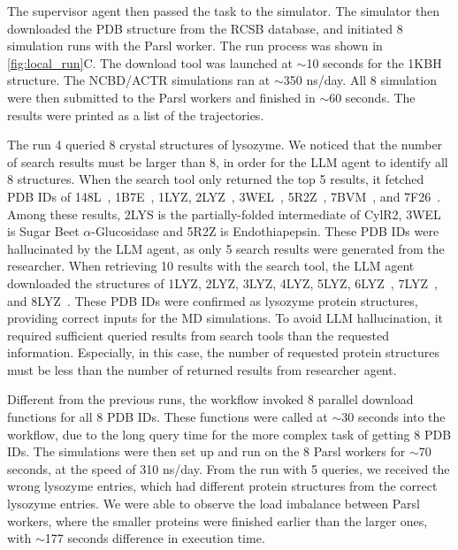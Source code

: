 The supervisor agent then passed the task to the simulator. 
The simulator then downloaded the PDB structure from the RCSB database, and initiated 8  simulation runs with the Parsl worker. 
The run process was shown in \autoref{fig:local_run}C. 
The download tool was launched at $\sim$10 seconds for the 1KBH structure. 
The NCBD/ACTR simulations ran at $\sim$350 ns/day. 
All 8 simulation were then submitted to the Parsl workers and finished in $\sim$60 seconds. 
The results were printed as a list of the trajectories. 


The run 4 queried 8 crystal structures of lysozyme. 
We noticed that the number of search results must be larger than 8, in order for the LLM agent to identify all 8 structures. 
When the search tool only returned the top 5 results, it fetched PDB IDs of 148L~\cite{kuroki1993covalent_148L}, 
1B7E~\cite{davies1999three_1b7e}, 
1LYZ, 
2LYZ~\cite{diamond1974real_1lyz}, 
3WEL~\cite{tagami2015structural_3wel}, 
5R2Z~\cite{wollenhaupt2020f2x_5r2z}, 
7BVM~\cite{nam2020polysaccharide_7bvm}, 
and 7F26~\cite{liang2021novel_7f26}.
Among these results, 2LYS is the partially-folded intermediate of CylR2, 3WEL is Sugar Beet $\alpha$-Glucosidase and 5R2Z is Endothiapepsin. 
These PDB IDs were hallucinated by the LLM agent, as only 5 search results were generated from the researcher. 
When retrieving 10 results with the search tool, the LLM agent downloaded the structures of 1LYZ, 
2LYZ, 
3LYZ, 
4LYZ, 
5LYZ, 
6LYZ~\cite{diamond1974real_1lyz}, 
7LYZ~\cite{herzberg1983protein_7lyz}, 
and 8LYZ~\cite{beddell1975x_8lyz}.
These PDB IDs were confirmed as lysozyme protein structures, providing correct inputs for the MD simulations. 
To avoid LLM hallucination, it required sufficient queried results from search tools than the requested information. 
Especially, in this case, the number of requested protein structures must be less than the number of returned results from researcher agent. 

Different from the previous runs, the workflow invoked 8 parallel download functions for all 8 PDB IDs. 
These functions were called at $\sim$30 seconds  into the workflow, due to the long query time for the more complex task of getting 8 PDB IDs. 
The simulations were then set up and run on the 8 Parsl workers for $\sim$70 seconds, at the speed of 310 ns/day. 
From the run with 5 queries, we received the wrong lysozyme entries, which had different protein structures from the correct lysozyme entries. 
We were able to observe the load imbalance between Parsl workers, where the smaller proteins were finished earlier than the larger ones, with $\sim$177 seconds difference in execution time. 

